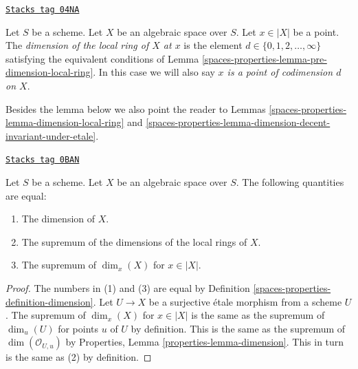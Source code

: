 \begin{definition}
\label{spaces-properties-definition-dimension-local-ring}
\href{https://stacks.math.columbia.edu/tag/04NA}{\texttt{Stacks tag 04NA}}

Let $S$ be a scheme. Let $X$ be an algebraic space over $S$. Let $x \in |X|$
be a point. The {\it dimension of the local ring of $X$ at $x$} is
the element $d \in \{0, 1, 2, \ldots, \infty\}$ satisfying the equivalent
conditions of Lemma \ref{spaces-properties-lemma-pre-dimension-local-ring}. In this case we
will also say {\it $x$ is a point of codimension $d$ on $X$}.
\end{definition}

Besides the lemma below we also point the reader to
Lemmas \ref{spaces-properties-lemma-dimension-local-ring} and
\ref{spaces-properties-lemma-dimension-decent-invariant-under-etale}.

\begin{lemma}[Dimension]
\label{spaces-properties-lemma-dimension}
\href{https://stacks.math.columbia.edu/tag/0BAN}{\texttt{Stacks tag 0BAN}}

Let $S$ be a scheme. Let $X$ be an algebraic space over $S$.
The following quantities are equal:
\begin{enumerate}
\item The dimension of $X$.
\item The supremum of the dimensions of the local rings of $X$.
\item The supremum of $\dim_x(X)$ for $x \in |X|$.
\end{enumerate}
\end{lemma}

\begin{proof}
The numbers in (1) and (3) are equal by Definition \ref{spaces-properties-definition-dimension}.
Let $U \to X$ be a surjective \'etale morphism from a scheme $U$.
The supremum of $\dim_x(X)$ for $x \in |X|$ is the same as the
supremum of $\dim_u(U)$ for points $u$ of $U$ by definition.
This is the same as the supremum of $\dim(\mathcal{O}_{U, u})$ by
Properties, Lemma \ref{properties-lemma-dimension}. This in turn
is the same as (2) by definition.
\end{proof}

